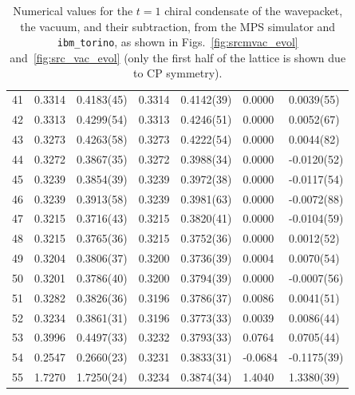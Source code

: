 \documentclass[aps, prc, tightenlines,superscriptaddress, letterpaper, amsmath, amssymb, preprintnumbers, floatfix, longbibliography, nofootinbib]{revtex4-2}
\begin{document}
\begin{table}[!htb]
{\begin{tabularx}{\textwidth}{| c || Y | Y | Y | Y | Y | Y |}
41	&	0.3314	&	0.4183(45)	&	0.3314	&	0.4142(39)	&	0.0000	&	0.0039(55)	\\
42	&	0.3313	&	0.4299(54)	&	0.3313	&	0.4246(51)	&	0.0000	&	0.0052(67)	\\
43	&	0.3273	&	0.4263(58)	&	0.3273	&	0.4222(54)	&	0.0000	&	0.0044(82)	\\
44	&	0.3272	&	0.3867(35)	&	0.3272	&	0.3988(34)	&	0.0000	&	-0.0120(52)	\\
45	&	0.3239	&	0.3854(39)	&	0.3239	&	0.3972(38)	&	0.0000	&	-0.0117(54)	\\
46	&	0.3239	&	0.3913(58)	&	0.3239	&	0.3981(63)	&	0.0000	&	-0.0072(88)	\\
47	&	0.3215	&	0.3716(43)	&	0.3215	&	0.3820(41)	&	0.0000	&	-0.0104(59)	\\
48	&	0.3215	&	0.3765(36)	&	0.3215	&	0.3752(36)	&	0.0000	&	0.0012(52)	\\
49	&	0.3204	&	0.3806(37)	&	0.3200	&	0.3736(39)	&	0.0004	&	0.0070(54)	\\
50	&	0.3201	&	0.3786(40)	&	0.3200	&	0.3794(39)	&	0.0000	&	-0.0007(56)	\\
51	&	0.3282	&	0.3826(36)	&	0.3196	&	0.3786(37)	&	0.0086	&	0.0041(51)	\\
52	&	0.3234	&	0.3861(31)	&	0.3196	&	0.3773(33)	&	0.0039	&	0.0086(44)	\\
53	&	0.3996	&	0.4497(33)	&	0.3232	&	0.3793(33)	&	0.0764	&	0.0705(44)	\\
54	&	0.2547	&	0.2660(23)	&	0.3231	&	0.3833(31)	&	-0.0684	&	-0.1175(39)	\\
55	&	1.7270	&	1.7250(24)	&	0.3234	&	0.3874(34)	&	1.4040	&	1.3380(39)	\\ \hline
\end{tabularx}}
\caption{Numerical values for the $t=1$ chiral condensate of the wavepacket, the vacuum, and their subtraction, from the MPS simulator and {\tt ibm\_torino}, as shown in Figs.~\ref{fig:srcmvac_evol} and~\ref{fig:src_vac_evol} (only the first half of the lattice is shown due to CP symmetry).}
 \label{tab:tablet1}
\end{table}
%
\end{document}
